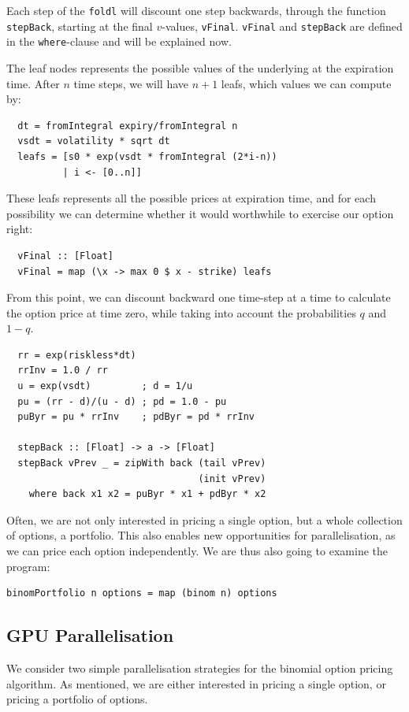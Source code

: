 \documentclass[preprint]{sigplanconf}
\begin{document}
Each step of the \verb|foldl| will discount one step backwards,
through the function \verb|stepBack|, starting at the final
$v$-values, \verb|vFinal|. \verb|vFinal| and \verb|stepBack| are
defined in the \verb|where|-clause and will be explained now.

The leaf nodes represents the possible values of the underlying at
the expiration time. After $n$ time steps, we will have $n+1$ leafs, which
values we can compute by:
\begin{verbatim}
  dt = fromIntegral expiry/fromIntegral n
  vsdt = volatility * sqrt dt
  leafs = [s0 * exp(vsdt * fromIntegral (2*i-n))
          | i <- [0..n]]
\end{verbatim}
These leafs represents all the possible prices at expiration time, and
for each possibility we can determine whether it would worthwhile to
exercise our option right:
\begin{verbatim}
  vFinal :: [Float]
  vFinal = map (\x -> max 0 $ x - strike) leafs
\end{verbatim}
From this point, we can discount backward one time-step at a time to
calculate the option price at time zero, while taking into account the
probabilities $q$ and $1-q$.
\begin{verbatim}
  rr = exp(riskless*dt)
  rrInv = 1.0 / rr
  u = exp(vsdt)         ; d = 1/u
  pu = (rr - d)/(u - d) ; pd = 1.0 - pu
  puByr = pu * rrInv    ; pdByr = pd * rrInv

  stepBack :: [Float] -> a -> [Float]
  stepBack vPrev _ = zipWith back (tail vPrev)
                                  (init vPrev)
    where back x1 x2 = puByr * x1 + pdByr * x2
\end{verbatim}

Often, we are not only interested in pricing a single option, but a
whole collection of options, a portfolio. This also enables new
opportunities for parallelisation, as we can price each option
independently. We are thus also going to examine the program:

\begin{verbatim}
binomPortfolio n options = map (binom n) options
\end{verbatim}

\subsection{GPU Parallelisation}
\label{sec:gpubinom}
We consider two simple parallelisation strategies for the binomial
option pricing algorithm. As mentioned, we are either interested in
pricing a single option, or pricing a portfolio of options.
\end{document}
